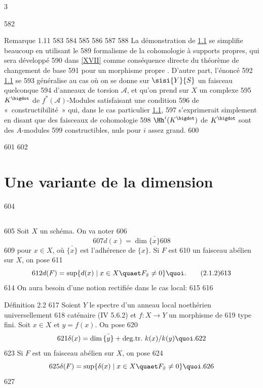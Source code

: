 3	\documentclass[10pt]{../fichiers-configuration-latex/smfart}
\begin{document}
   582	\begin{enonce*}[remark]{Remarque 1.11}
   583	%
   584	%
   585	%
   586	%
   587	%
   588	La démonstration de \hyperref[XIV.thm1.1]{1.1} se simplifie beaucoup en utilisant le
   589	formalisme de la cohomologie à supports propres, qui sera développé
   590	dans \ref{XVII} comme conséquence directe du théorème de changement de base
   591	pour un morphisme propre . D'autre part, l'énoncé
   592	\hyperref[XIV.thm1.1]{1.1} se 
   593	généralise au cas où on se donne sur $\sisi{Y}{S}$ un faisceau quelconque
   594	d'anneaux de torsion $𝒜$, et qu'on prend sur $X$ un complexe
   595	$K^{\bigdot}$ de $f^{\ast}(𝒜)$-Modules satisfaisant une condition
   596	de « constructibilité » qui, dans le cas particulier \hyperref[XIV.thm1.1]{1.1},
   597	s'exprimerait simplement en disant que des faisceaux de cohomologie
   598	$\Hh^{i}(K^{\bigdot})$ de $K^{\bigdot}$ sont des $A$-modules
   599	constructibles, nuls pour $i$ assez grand.
   600	\end{enonce*}
   601	
   602	\section{Une variante de la dimension}	
   604	\subsection{}
   605	Soit $X$ un schéma. On  va noter
   606	\begin{equation*}
   607	d(x)=\dim\bar{\{x\}}\tag{2.1.1}
   608	\end{equation*}
   609	pour $x\in X$, où $\bar{\{x\}}$ est l'adhérence de $\{x\}$. Si $F$ est
   610	un faisceau abélien sur $X$, on pose
   611	\begin{equation*}
   612	d(F)=\sup \{d(x)\mid x\in X \quaet F_{\bar{x}}\neq 0\}{\quoi}.\tag{2.1.2}
   613	\end{equation*}
   614	On aura besoin d'une notion rectifiée dans le cas local:
   615	
   616	\begin{enonce*}{Définition 2.2}
   617	Soient $Y$ le spectre d'un anneau local noethérien universellement
   618	caténaire (\EGA IV 5.6.2) et $f:X\rightarrow Y$ un morphisme de
   619	type fini. Soit $x\in X$ et $y=f(x)$. On pose
   620	$$
   621	\delta(x)=\dim\bar{\{y\}}+\degtr k(x)/k(y){\quoi}.
   622	$$
   623	Si $F$ est un faisceau abélien sur $X$, on pose
   624	$$
   625	\delta(F)=\sup \{\delta(x)\mid x\in X\quaet F_{\bar{x}}\neq 0\}{\quoi}.
   626	$$
   627	\end{enonce*}
\end{document}
